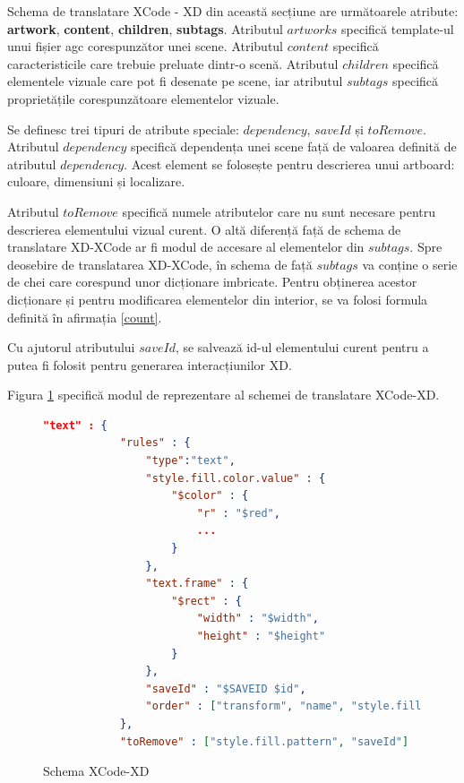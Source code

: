 Schema de translatare XCode - XD din această secțiune are următoarele atribute: \textbf{artwork}, \textbf{content}, \textbf{children}, \textbf{subtags}. Atributul $artworks$ specifică template-ul unui fișier agc corespunzător unei scene. Atributul $content$ specifică caracteristicile care trebuie preluate dintr-o scenă. Atributul $children$ specifică elementele vizuale care pot fi desenate pe scene, iar atributul $subtags$ specifică proprietățile corespunzătoare elementelor vizuale.

Se definesc trei tipuri de atribute speciale: $dependency$, $saveId$ și $toRemove$. Atributul $dependency$ specifică
dependența unei scene față de valoarea definită de atributul $dependency$. Acest element se folosește pentru descrierea unui artboard: culoare, dimensiuni și localizare.

Atributul $toRemove$ specifică numele atributelor care nu sunt necesare pentru descrierea elementului vizual curent.
O altă diferență față de schema de translatare XD-XCode ar fi modul de accesare al elementelor din $subtags$.
Spre deosebire de translatarea XD-XCode, în schema de față $subtags$ va conține o serie de chei care corespund unor dicționare imbricate. Pentru obținerea acestor dicționare și pentru modificarea elementelor din interior, se va folosi formula definită în afirmația \ref{count}.

Cu ajutorul atributului $saveId$, se salvează id-ul elementului curent pentru a putea fi folosit pentru generarea interacțiunilor XD.

Figura \ref{fig:Schema2} specifică modul de reprezentare al schemei de translatare XCode-XD.

\begin{figure}[!htbp]
\begin{lstlisting}[language=json,firstnumber=1]
 "text" : {
            "rules" : {
                "type":"text",
                "style.fill.color.value" : {
                    "$color" : {
                        "r" : "$red",
                        ...
                    }
                },
                "text.frame" : {
                    "$rect" : {
                        "width" : "$width",
                        "height" : "$height"
                    }
                },
                "saveId" : "$SAVEID $id",
                "order" : ["transform", "name", "style.fill.color.value", "style.font", "text.frame", "text.rawText", "meta.ux.rangedStyles", "text.paragraphs", "saveId"]
            },
            "toRemove" : ["style.fill.pattern", "saveId"] 
\end{lstlisting}
\caption{Schema XCode-XD} \label{fig:Schema2}
\end{figure}

